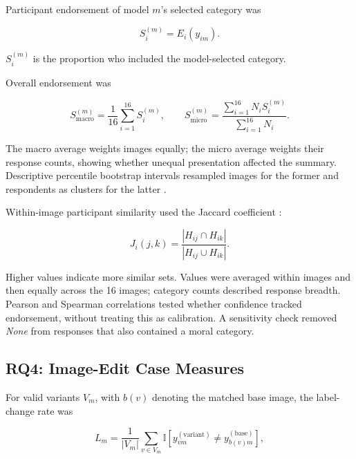 Participant endorsement of model \(m\)'s selected category was

\begin{equation}
    S_i^{(m)}
    =
    E_i(y_{im}).
\end{equation}

\(S_i^{(m)}\) is the proportion who included the model-selected category.

Overall endorsement was

\begin{equation}
    S_{\mathrm{macro}}^{(m)}
    =
    \frac{1}{16}
    \sum_{i=1}^{16}
    S_i^{(m)},
    \qquad
    S_{\mathrm{micro}}^{(m)}
    =
    \frac{
        \sum_{i=1}^{16}N_iS_i^{(m)}
    }{
        \sum_{i=1}^{16}N_i
    }.
\end{equation}

The macro average weights images equally; the micro average weights their
response counts, showing whether unequal presentation affected the summary.
Descriptive percentile bootstrap intervals resampled images for the former and
respondents as clusters for the latter \cite{efron1993bootstrap}.

Within-image participant similarity used the Jaccard coefficient
\cite{jaccard1912distribution}:

\begin{equation}
    J_i(j,k)
    =
    \frac{
        |H_{ij}\cap H_{ik}|
    }{
        |H_{ij}\cup H_{ik}|
    }.
\end{equation}

Higher values indicate more similar sets. Values were averaged within images
and then equally across the 16 images; category counts described response
breadth. Pearson and Spearman correlations tested whether confidence tracked
endorsement, without treating this as calibration. A sensitivity check removed
\textit{None} from responses that also contained a moral category.


\subsection{RQ4: Image-Edit Case Measures}

For valid variants \(V_m\), with \(b(v)\) denoting the matched base image, the
label-change rate was

\begin{equation}
    L_m
    =
    \frac{1}{|V_m|}
    \sum_{v\in V_m}
    \mathbb{I}\!\left[
        y_{vm}^{(\mathrm{variant})}
        \neq
        y_{b(v)m}^{(\mathrm{base})}
    \right],
\end{equation}

